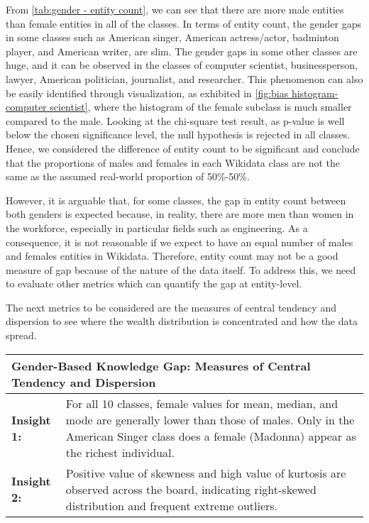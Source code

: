 From \autoref{tab:gender - entity count}, we can see that there are more male entities than female entities in all of the classes. In terms of entity count, the gender gaps in some classes such as American singer, American actress/actor, badminton player, and American writer, are slim. The gender gaps in some other classes are huge, and it can be observed in the classes of computer scientist, businessperson, lawyer, American politician, journalist, and researcher. This phenomenon can also be easily identified through visualization, as exhibited in \autoref{fig:bias histogram-computer scientist}, where the histogram of the female subclass is much smaller compared to the male. Looking at the chi-square test result, as p-value is well below the chosen significance level, the null hypothesis is rejected in all classes. Hence, we considered the difference of entity count to be significant and conclude that the proportions of males and females in each Wikidata class are not the same as the assumed real-world proportion of 50\%-50\%.

However, it is arguable that, for some classes, the gap in entity count between both genders is expected because, in reality, there are more men than women in the workforce, especially in particular fields such as engineering. As a consequence, it is not reasonable if we expect to have an equal number of males and females entities in Wikidata. Therefore, entity count may not be a good measure of gap because of the nature of the data itself. To address this, we need to evaluate other metrics which can quantify the gap at entity-level.

The next metrics to be considered are the measures of central tendency and dispersion to see where the wealth distribution is concentrated and how the data spread.

\begin{table}[h]
    \centering
    \renewcommand{\arraystretch}{1.3}
    \begin{tabular}{|l p{12cm}|} 
        \hline
        \multicolumn{2}{|l|}{\textbf{Gender-Based Knowledge Gap: Measures of Central Tendency and Dispersion}} \\
        \hline
        \textbf{Insight 1:} & For all 10 classes, female values for mean, median, and mode are generally lower than those of males. Only in the American Singer class does a female (Madonna) appear as the richest individual. \\
        \textbf{Insight 2:} & Positive value of skewness and high value of kurtosis are observed across the board, indicating right-skewed distribution and frequent extreme outliers. \\
        \hline
    \end{tabular}
\end{table}

